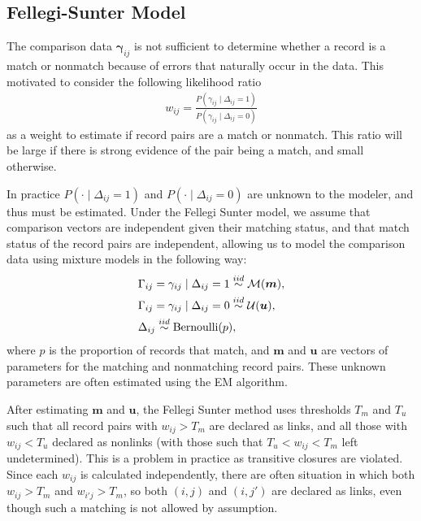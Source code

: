\documentclass[12pt,letterpaper]{article}
\newcommand{\1}[1]{\mathbb{I}\!\left[#1\right]} %
\begin{document}

\subsection{Fellegi-Sunter Model}
The comparison data $\bm{\gamma}_{ij}$ is not sufficient to determine whether a record is a match or nonmatch because of errors that naturally occur in the data. This motivated \cite{fellegi_theory_1969} to consider the following likelihood ratio
\begin{align}
	\label{eqn:wts}
	w_{ij} = \frac{P(\gamma_{ij} \mid \Delta_{ij} = 1)}{P(\gamma_{ij} \mid \Delta_{ij} = 0)}
\end{align}
as a weight to estimate if record pairs are a match or nonmatch. This ratio will be large if there is strong evidence of the pair being a match, and small otherwise. 

In practice $P(\cdot \mid \Delta_{ij} = 1)$ and $P(\cdot \mid \Delta_{ij} = 0)$ are unknown to the modeler, and thus must be estimated. Under the Fellegi Sunter model, we assume that comparison vectors are independent given their matching status, and that match status of the record pairs are independent, allowing us to model 
the comparison data using mixture models in the following way:
\begin{align}
	&\Gamma_{ij} = \gamma_{ij} \mid \Delta_{ij} = 1 \stackrel{iid}{\sim} \mathcal{M}(\bm{m}), \\
	&\Gamma_{ij} = \gamma_{ij} \mid \Delta_{ij} = 0  \stackrel{iid}{\sim} \mathcal{U}(\bm{u}), \notag\\
	& \Delta_{ij}   \stackrel{iid}{\sim} \text{Bernoulli}(p), \notag
\end{align}
where $p$ is the proportion of records that match, and $\bm{m}$ and $\bm{u}$ are vectors of parameters for the matching and nonmatching record pairs. These unknown parameters are often estimated using the EM algorithm. 

After estimating $\bm{m}$ and $\bm{u}$, the Fellegi Sunter method uses thresholds $T_m$ and $T_u$ such that all record pairs with $w_{ij} > T_m$ are declared as links, and all those with $w_{ij} < T_u$ declared as nonlinks (with those such that $T_u < w_{ij} < T_m$ left undetermined). This is a problem in practice as transitive closures are violated. Since each $w_{ij}$ is calculated independently, there are often situation in which both $w_{ij} > T_m$ and $w_{i'j} > T_m$, so both $(i,j)$ and $(i, j')$ are declared as links, even though such a matching is not allowed by assumption. 
\end{document}
